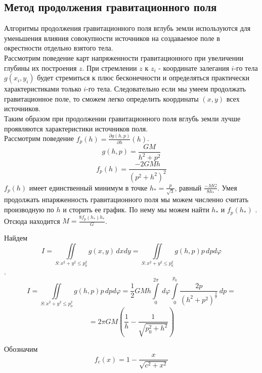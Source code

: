 \documentclass[12pt]{article}
\begin{document}
\subsection
{Метод продолжения гравитационного поля}

Алгоритмы продолжения гравитационного поля вглубь земли используются для уменьшения влияния совокупности источников на создаваемое поле в окрестности отдельно взятого тела.\\
\newline
Рассмотрим поведение карт напряженности гравитационного при увеличении глубины их построения $z$.
При стремлении $z$ к $z_{i}$ - координате залегания $i$-го тела $g(x_i,y_i)$ будет стремиться к плюс бесконечности и определяться практически характеристиками только $i$-го тела.
Следовательно если мы умеем продолжать гравитационное поле, то сможем легко определить координаты $(x,y)$ всех источников.\\
\newline
Таким образом при продолжении гравитационного поля вглубь земли лучше проявляются характеристики источников поля.\\

Рассмотрим поведение $f_{p}(h)=\displaystyle{\frac{{\partial}g(h,p)}{{\partial}h}}(h)$.
\[g(h,p)=\frac{GM}{h^2+p^2}\]
\[f_p(h)=\frac{-2GMh}{(p^2+h^2)^2}\]
$f_p(h)$ имеет единственный минимум в точке $\displaystyle{h_{*}=\frac{p}{\sqrt{3}}}$, равный $\displaystyle\frac{-MG}{8h_{*}}$.
Умея продолжать нпаряженность гравитационного поля мы можем численно считать производную по $h$ и сторить ее график. По нему мы можем найти $h_{*}$
и $f_p(h_{*})$ . Отсюда находится $M=\displaystyle\frac{8f_p(h_{*})h_{*}}{G}$.

Найдем \[I = \iint\limits_{S:x^2+y^2{\leq}p_0^2} g(x,y) \,dxdy = \iint\limits_{S:x^2+y^2{\leq}p_0^2} g(h,p) p\,dpd{\varphi} \].
 \[I = \iint\limits_{S:x^2+y^2{\leq}p_0^2} g(h,p) p\,dpd{\varphi} = \frac{1}{2}GMh{\int\limits_{0}^{2\pi}\,d{\varphi}}{\int\limits_{0}^{p_0}\frac{2p}{(h^2+p^2)^{\frac{3}{2}}}\,dp}=\]
\[=2{\pi}GM\left(\frac{1}{h}-\frac{1}{\sqrt{p_0^2+h^2}} \right)\]

Обозначим $$f_c(x)=1-\frac{x}{\sqrt{c^2+x^2}}$$
\end{document}
